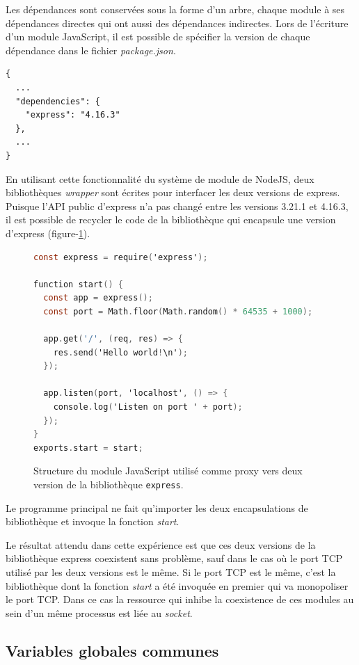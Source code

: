Les dépendances sont conservées sous la forme d'un arbre, chaque module à ses dépendances directes
qui ont aussi des dépendances indirectes.  Lors de l'écriture d'un module JavaScript, il est possible
de spécifier la version de chaque dépendance dans le fichier \textit{package.json}.
\begin{verbatim}
{
  ...
  "dependencies": {
    "express": "4.16.3"
  },
  ...
}
\end{verbatim}
En utilisant cette fonctionnalité du système de module de NodeJS, deux bibliothèques \textit{wrapper}
sont écrites pour interfacer les deux versions de express. Puisque l'API public d'express n'a pas changé entre
les versions 3.21.1 et 4.16.3, il est possible de recycler le code de la bibliothèque qui encapsule une
version d'express (figure-\ref{fig:express}).
\begin{center}
\begin{figure}[ht]
    \begin{lstlisting}[language=C,frame=single]
const express = require('express');

function start() {
  const app = express();
  const port = Math.floor(Math.random() * 64535 + 1000);

  app.get('/', (req, res) => {
    res.send('Hello world!\n');
  });

  app.listen(port, 'localhost', () => {
    console.log('Listen on port ' + port);
  });
}
exports.start = start;
\end{lstlisting}
  \caption{Structure du module JavaScript utilisé comme proxy vers deux version
    de la bibliothèque \texttt{express}.}
  \label{fig:express}
\end{figure}
\end{center}
Le programme principal ne fait qu'importer les deux encapsulations de bibliothèque
et invoque la fonction \textit{start}.

Le résultat attendu dans cette expérience est que ces deux versions de la bibliothèque
express coexistent sans problème, sauf dans le cas où le port TCP utilisé par les deux
versions est le même. Si le port TCP est le même, c'est la bibliothèque dont la fonction
\textit{start} a été invoquée en premier qui va monopoliser le port TCP. Dans ce cas
la ressource qui inhibe la coexistence de ces modules au sein d'un même processus
est liée au \textit{socket}.

\subsection{Variables globales communes}

